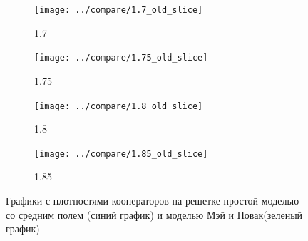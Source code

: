 \documentclass[a4paper]{article}
\begin{document}
	\begin{figure}
		\ContinuedFloat
		\begin{subfigure}{.5\textwidth}
		\texttt{[image: ../compare/1.7\_old\_slice]}
		\caption{1.7}
		\label{fig:29}
		\end{subfigure}
		\begin{subfigure}{.5\textwidth}
		\texttt{[image: ../compare/1.75\_old\_slice]}
		\caption{1.75}
		\label{fig:30}
		\end{subfigure}%
	
	
		\begin{subfigure}{.5\textwidth}
		\texttt{[image: ../compare/1.8\_old\_slice]}
		\caption{1.8}
		\label{fig:31}
		\end{subfigure}
		\begin{subfigure}{.5\textwidth}
		\texttt{[image: ../compare/1.85\_old\_slice]}
		\caption{1.85}
		\label{fig:32}
		\end{subfigure}%
	
	\label{fig:2}
	\caption{Графики с плотностями кооператоров на решетке простой моделью со средним полем (синий график) и моделью Мэй и Новак(зеленый график)}
	\end{figure}
\end{document}

